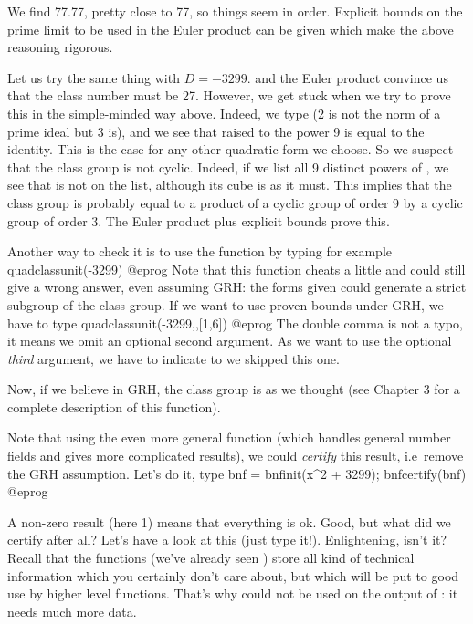 We find 77.77, pretty close to 77, so things seem in order. Explicit bounds
on the prime limit to be used in the Euler product can be given which make
the above reasoning rigorous.

Let us try the same thing with $D=-3299$.  and the Euler
product convince us that the class number must be 27. However, we get stuck
when we try to prove this in the simple-minded way above. Indeed, we type
 (2 is not the norm of a prime ideal but
3 is), and we see that  raised to the power 9 is equal to the identity.
This is the case for any other quadratic form we choose. So we suspect that the
class group is not cyclic. Indeed, if we list all 9 distinct powers of ,
we see that  is not on the list, although its cube
is as it must. This implies that the class group is probably equal to a
product of a cyclic group of order 9 by a cyclic group of order 3. The Euler
product plus explicit bounds prove this.

Another way to check it is to use the  function by typing
for example
\bprog
  quadclassunit(-3299)
@eprog\noindent
Note that this function cheats a little and could still give a wrong answer,
even assuming GRH: the forms given could generate a strict subgroup of the
class group. If we want to use proven bounds under GRH, we have to type
\bprog
  quadclassunit(-3299,,[1,6])
@eprog\noindent
The double comma \kbd{,,} is not a typo, it means we omit an optional second
argument. As we want to use the optional \emph{third} argument, we have to
indicate to  we skipped this one.

Now, if we believe in GRH, the class group is as we thought (see Chapter 3
for a complete description of this function).

  Note that using the even more general function  (which handles
general number fields and gives more complicated results), we could
\emph{certify} this result, i.e~remove the GRH assumption. Let's do it, type
\bprog
  bnf = bnfinit(x^2 + 3299); bnfcertify(bnf)
@eprog

  A non-zero result (here 1) means that everything is ok. Good, but what did
we certify after all? Let's have a look at this  (just type it!).
Enlightening, isn't it? Recall that the  functions (we've already
seen ) store all kind of technical information which you
certainly don't care about, but which will be put to good use by higher level
functions. That's why  could not be used on the output of
: it needs much more data.


